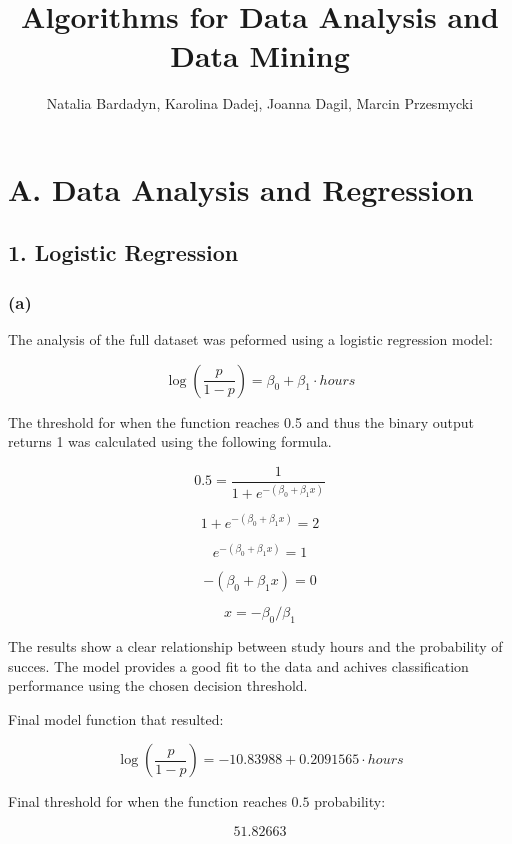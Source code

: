 \documentclass{article}
\title{Algorithms for Data Analysis and Data Mining}
\author{
    Natalia Bardadyn,
    Karolina Dadej,
    Joanna Dagil,
    Marcin Przesmycki
    }
\begin{document}
\maketitle

%
% 
%
%

\section*{A. Data Analysis and Regression}



\subsection*{1. Logistic Regression}

\subsubsection*{(a)}

The analysis of the full dataset was peformed using a logistic regression model:

\[
\log\left(\frac{p}{1-p}\right) = \beta_0 + \beta_1 \cdot hours
\]

The threshold for when the function reaches 0.5 and thus the binary output returns 1 was calculated using the following formula.

$$
0.5 = \frac{1}{1+ e^{-(\beta_0 + \beta_1 x)}} 
$$

$$
{1+ e^{-(\beta_0 + \beta_1 x)}} = 2
$$

$$
e^{-(\beta_0 + \beta_1 x)} = 1
$$

$$
-(\beta_0 + \beta_1 x) = 0
$$

$$
x = - \beta_0 / \beta_1
$$

The results show a clear relationship between study hours and the probability of succes. The model provides a good fit to the data and achives classification performance using the chosen decision threshold.

Final model function that resulted:

\[
\log\left(\frac{p}{1-p}\right) = -10.83988   + 0.2091565  \cdot hours
\]

Final threshold for when the function reaches $0.5$ probability:

\[
51.82663 
\]
\end{document}
